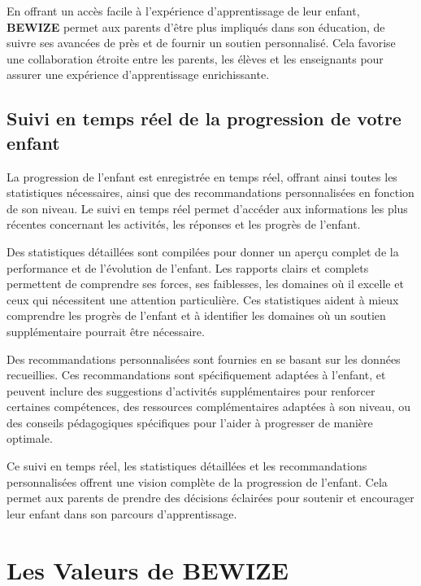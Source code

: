 En offrant un accès facile à l'expérience d'apprentissage de leur enfant, \textbf{BEWIZE} permet aux parents d'être plus impliqués dans son éducation, de suivre ses avancées de près et de fournir un soutien personnalisé. Cela favorise une collaboration étroite entre les parents, les élèves et les enseignants pour assurer une expérience d'apprentissage enrichissante.

\subsection{Suivi en temps réel de la progression de votre enfant}
La progression de l'enfant est enregistrée en temps réel, offrant ainsi toutes les statistiques nécessaires, ainsi que des recommandations personnalisées en fonction de son niveau. Le suivi en temps réel permet d'accéder aux informations les plus récentes concernant les activités, les réponses et les progrès de l'enfant.

Des statistiques détaillées sont compilées pour donner un aperçu complet de la performance et de l'évolution de l'enfant. Les rapports clairs et complets permettent de comprendre ses forces, ses faiblesses, les domaines où il excelle et ceux qui nécessitent une attention particulière. Ces statistiques aident à mieux comprendre les progrès de l'enfant et à identifier les domaines où un soutien supplémentaire pourrait être nécessaire.

Des recommandations personnalisées sont fournies en se basant sur les données recueillies. Ces recommandations sont spécifiquement adaptées à l'enfant, et peuvent inclure des suggestions d'activités supplémentaires pour renforcer certaines compétences, des ressources complémentaires adaptées à son niveau, ou des conseils pédagogiques spécifiques pour l'aider à progresser de manière optimale.

Ce suivi en temps réel, les statistiques détaillées et les recommandations personnalisées offrent une vision complète de la progression de l'enfant. Cela permet aux parents de prendre des décisions éclairées pour soutenir et encourager leur enfant dans son parcours d'apprentissage.


\section{Les Valeurs de BEWIZE}


